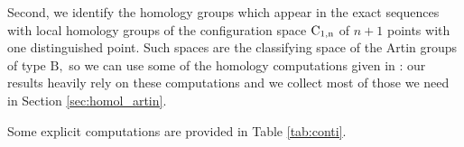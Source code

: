 Second, we identify the homology groups which appear in the exact sequences with local homology groups of the configuration space $\operatorname{C_{1,n}}$ of $n+1$ points with one distinguished point. Such spaces are the classifying space of the  Artin groups of type $\mathrm{B},$ so we can use some of  the homology computations given in \cite{calmar}: our results heavily rely on these computations and we collect most of those we need in Section \ref{sec:homol_artin}.

Some explicit computations are provided in Table \ref{tab:conti}.
%

